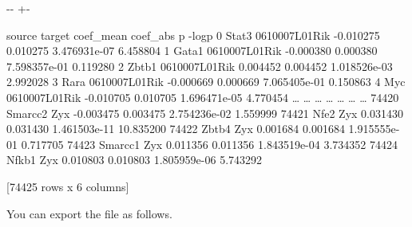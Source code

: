 \documentclass[letterpaper,10pt,english]{sphinxmanual}
\newlength\nbsphinxcodecellspacing
\begin{document}
{

\kern-\sphinxverbatimsmallskipamount\kern-\baselineskip
\kern+\FrameHeightAdjust\kern-\fboxrule
\vspace{\nbsphinxcodecellspacing}

\begin{sphinxVerbatim}[commandchars=\\\{\}]
\llap{\color{nbsphinxout}[73]:\,\hspace{\fboxrule}\hspace{\fboxsep}}        source         target  coef\_mean  coef\_abs             p      -logp
0        Stat3  0610007L01Rik  -0.010275  0.010275  3.476931e-07   6.458804
1        Gata1  0610007L01Rik  -0.000380  0.000380  7.598357e-01   0.119280
2        Zbtb1  0610007L01Rik   0.004452  0.004452  1.018526e-03   2.992028
3         Rara  0610007L01Rik  -0.000669  0.000669  7.065405e-01   0.150863
4          Myc  0610007L01Rik  -0.010705  0.010705  1.696471e-05   4.770454
{\ldots}        {\ldots}            {\ldots}        {\ldots}       {\ldots}           {\ldots}        {\ldots}
74420  Smarcc2            Zyx  -0.003475  0.003475  2.754236e-02   1.559999
74421     Nfe2            Zyx   0.031430  0.031430  1.461503e-11  10.835200
74422    Zbtb4            Zyx   0.001684  0.001684  1.915555e-01   0.717705
74423  Smarcc1            Zyx   0.011356  0.011356  1.843519e-04   3.734352
74424    Nfkb1            Zyx   0.010803  0.010803  1.805959e-06   5.743292

[74425 rows x 6 columns]
\end{sphinxVerbatim}
}

You can export the file as follows.

{
\begin{sphinxVerbatim}[commandchars=\\\{\}]
\llap{\color{nbsphinxin}[ ]:\,\hspace{\fboxrule}\hspace{\fboxsep}}
  

\PYG{p}{[}\PYG{p}{]}
\end{sphinxVerbatim}
}
\end{document}
